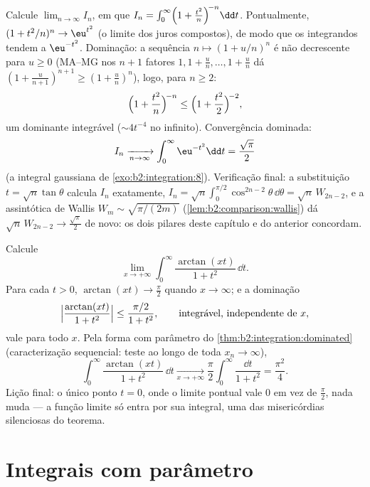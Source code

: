 \begin{example}\label{ex:b2:integration:wallislimit}
Calcule $\displaystyle\lim_{n\to\infty} I_n$, em que $I_n =
\int_0^\infty \Bigl(1 + \frac{t^2}{n}\Bigr)^{\!-n}\dd t$.
Pontualmente, $(1 + t^2/n)^n \to \eu^{t^2}$ (o limite dos juros
compostos), de modo que os integrandos tendem a $\eu^{-t^2}$. Dominação: a
sequência $n \mapsto (1 + u/n)^n$ é não decrescente para $u \geq 0$
(MA--MG nos $n + 1$ fatores $1, 1 + \frac un, \dots, 1 +
\frac un$ dá $(1 + \frac u{n+1})^{n+1} \geq (1 + \frac
un)^n$), logo, para $n \geq 2$:
\[
\Bigl(1 + \frac{t^2}{n}\Bigr)^{\!-n}
\leq \Bigl(1 + \frac{t^2}{2}\Bigr)^{\!-2},
\]
um dominante integrável ($\sim 4t^{-4}$ no infinito). Convergência
dominada:
\[
I_n \xrightarrow[n\to\infty]{} \int_0^\infty \eu^{-t^2}\dd t
= \frac{\sqrt\pi}{2}
\]
(a integral gaussiana de \cref{exo:b2:integration:8}). Verificação
final: a substituição $t = \sqrt n\tan\theta$ calcula $I_n$
exatamente, $I_n = \sqrt n\int_0^{\pi/2}\cos^{2n-2}\theta\,\dd\theta
= \sqrt n\,W_{2n-2}$, e a assintótica de Wallis $W_m \sim
\sqrt{\pi/(2m)}$ (\cref{lem:b2:comparison:wallis}) dá $\sqrt
n\,W_{2n-2} \to \frac{\sqrt\pi}2$ de novo: os dois pilares deste
capítulo e do anterior concordam.
\end{example}

\begin{example}
\label{ex:b2:integration:arctanlimit}
Calcule
\[
\lim_{x\to+\infty}\int_0^\infty
\frac{\arctan(xt)}{1+t^2}\,\dd t .
\]
Para cada $t > 0$,
$\arctan(xt) \to \frac\pi2$ quando $x \to \infty$; e a
dominação
\[
\Bigl|\frac{\arctan(xt)}{1+t^2}\Bigr|
\leq \frac{\pi/2}{1+t^2},
\qquad\text{integrável, independente de } x,
\]
vale para todo $x$. Pela forma com parâmetro  do
\cref{thm:b2:integration:dominated} (caracterização
sequencial: teste ao longo de toda $x_n \to \infty$),
\[
\int_0^\infty\frac{\arctan(xt)}{1+t^2}\,\dd t
\xrightarrow[x\to+\infty]{}
\frac\pi2\int_0^\infty\frac{\dd t}{1+t^2}
= \frac{\pi^2}{4} .
\]
Lição final: o único ponto $t = 0$, onde o limite pontual
vale $0$ em vez de $\frac\pi2$, nada muda --- a
função limite só entra por sua integral, uma das
misericórdias silenciosas do teorema.
\end{example}

\section{Integrais com parâmetro}


